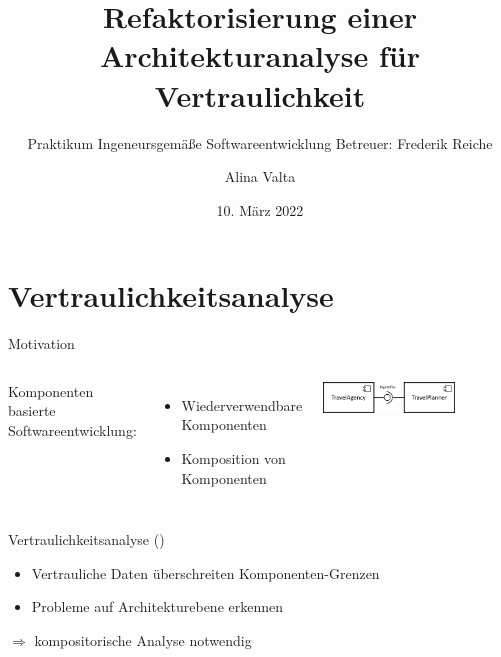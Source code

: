 \documentclass{sdqbeamer}
\title[Refaktorisierung einer Architekturanalyse für Vertraulichkeit]{Refaktorisierung einer Architekturanalyse für Vertraulichkeit}
\subtitle{Praktikum Ingeneursgemäße Softwareentwicklung \hspace{5cm}Betreuer: Frederik Reiche}
\author[Alina Valta]{Alina Valta}
\date[10.\,03.\,2022]{10. März 2022}
\begin{document}
\renewcommand{\figurename}{Abb}
\KITtitleframe


\section{Vertraulichkeitsanalyse}

\begin{frame}{Motivation}
	\begin{columns}
	Komponenten basierte Softwareentwicklung:
	\begin{itemize}
		\item Wiederverwendbare Komponenten
		\item Komposition von Komponenten
	\end{itemize}
	\includegraphics[width=0.7\textwidth]{images/CBSE_example.png}
	\end{columns}
\vspace{0.05\textheight}
	Vertraulichkeitsanalyse (\cite{kramer2017model})
	\begin{itemize}
		\item Vertrauliche Daten überschreiten Komponenten-Grenzen
		\item Probleme auf Architekturebene erkennen
	\end{itemize}
\vspace{0.05\textheight}
$\Rightarrow$ kompositorische Analyse notwendig
\end{frame}
\end{document}
